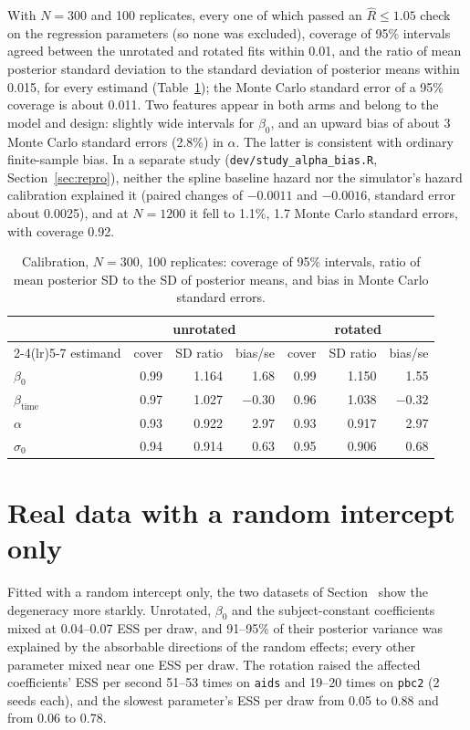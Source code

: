 With $N = 300$ and 100 replicates, every one of which passed an $\hat R
\leq 1.05$ check on the regression parameters (so none was excluded),
coverage of 95\% intervals agreed between the unrotated and rotated fits
within 0.01, and the ratio of mean posterior standard deviation to the
standard deviation of posterior means within 0.015, for every estimand
(Table~\ref{tab:cal}); the Monte Carlo standard error of a 95\% coverage is
about 0.011. Two features appear in both arms and belong to the model and
design: slightly wide intervals for $\beta_0$, and an upward bias of about
3 Monte Carlo standard errors (2.8\%) in $\alpha$. The latter is consistent
with ordinary finite-sample bias. In a separate study
(\texttt{dev/study\_alpha\_bias.R}, Section~\ref{sec:repro}), neither the spline baseline hazard nor
the simulator's hazard calibration explained it (paired changes of
$-0.0011$ and $-0.0016$, standard error about 0.0025), and at $N = 1200$ it
fell to 1.1\%, 1.7 Monte Carlo standard errors, with coverage 0.92.

\begin{table}[ht]
\centering
\caption{Calibration, $N = 300$, 100 replicates: coverage of 95\%
intervals, ratio of mean posterior SD to the SD of posterior means, and
bias in Monte Carlo standard errors.}
\label{tab:cal}
\small
\begin{tabular}{l rrr rrr}
\toprule
& \multicolumn{3}{c}{unrotated} & \multicolumn{3}{c}{rotated} \\
\cmidrule(lr){2-4}\cmidrule(lr){5-7}
estimand & cover & SD ratio & bias/se & cover & SD ratio & bias/se \\
\midrule
$\beta_0$           & 0.99 & 1.164 &  1.68 & 0.99 & 1.150 &  1.55 \\
$\beta_{\mathrm{time}}$ & 0.97 & 1.027 & $-0.30$ & 0.96 & 1.038 & $-0.32$ \\
$\alpha$            & 0.93 & 0.922 &  2.97 & 0.93 & 0.917 &  2.97 \\
$\sigma_0$          & 0.94 & 0.914 &  0.63 & 0.95 & 0.906 &  0.68 \\
\bottomrule
\end{tabular}
\end{table}

\section{Real data with a random intercept only}\label{sec:realq1}

Fitted with a random intercept only, the two datasets of
Section~ show the degeneracy more starkly. Unrotated,
$\beta_0$ and the subject-constant coefficients mixed at 0.04--0.07 ESS per
draw, and 91--95\% of their posterior variance was explained by the
absorbable directions of the random effects; every other parameter mixed
near one ESS per draw. The rotation raised the affected coefficients' ESS
per second 51--53 times on \texttt{aids} and 19--20 times on \texttt{pbc2}
(2 seeds each), and the slowest parameter's ESS per draw from 0.05 to 0.88
and from 0.06 to 0.78.

